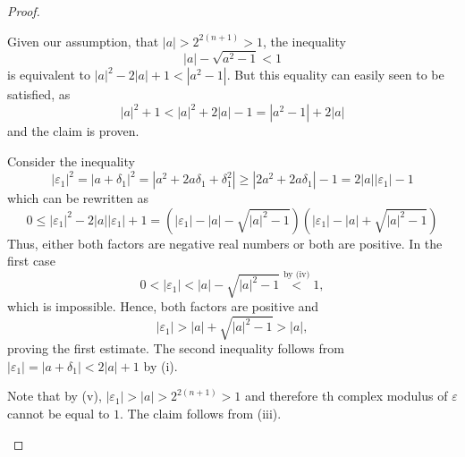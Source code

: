 \begin{proof}
\begin{plist}
    \item Given our assumption, that \(|a| > 2^{2(n + 1)} > 1\), the inequality
    \[
      |a| - \sqrt{a^2 - 1} < 1
    \]
    is equivalent to \(|a|^2 - 2 |a| + 1 < |a^2 - 1|\). But this equality can easily seen to be satisfied, as
    \[
      |a|^2 + 1 < |a|^2 + 2|a| - 1 = |a^2 - 1| + 2 |a|
    \]
    and the claim is proven.

    \item Consider the inequality
    \[
      |ε_1|^2 = |a + δ_1|^2 = |a^2 + 2 a δ_1 + δ_1^2| ≥ |2a^2 + 2a δ_1| - 1 = 2 |a| |ε_1| - 1
    \]
    which can be rewritten as
    \[
      0 ≤ |ε_1|^2 - 2 |a| |ε_1| + 1 = \left(|ε_1| - |a| - \sqrt{|a|^2 - 1}\right) \left(|ε_1| - |a| + \sqrt{|a|^2 - 1}\right)
    \]
    Thus, either both factors are negative real numbers or both are positive. In the first case
    \[
      0 < |ε_1| < |a| - \sqrt{|a|^2 - 1} \overset{\text{by (iv)}}{<} 1,
    \]
    which is impossible. Hence, both factors are positive and
    \[
      |ε_1| > |a| + \sqrt{|a|^2 - 1}  > |a|,
    \]
    proving the first estimate. The second inequality follows from \(|ε_1| = |a + δ_1| < 2|a| + 1\) by (i).

    \item Note that by (v), \(|ε_1| > |a| > 2^{2(n + 1)} > 1\) and therefore th
    complex modulus of \(ε\) cannot be equal to \(1\). The claim follows from
    (iii).
  \end{plist}
\end{proof}

%
%
%
